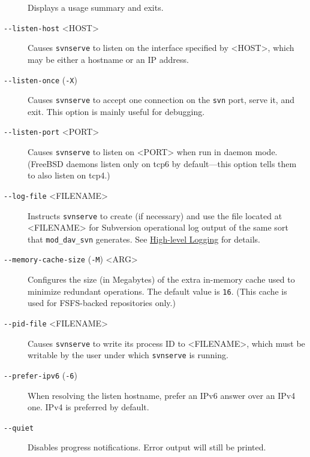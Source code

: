 \begin{description}
Displays a usage summary and exits.
\item[\protect\phantomsection\label{svn.ref.svnserve.sw.listen_host}{}\texttt{-\/-listen-host}
\textless HOST\textgreater{}]
Causes \texttt{svnserve} to listen on the interface specified by
\textless HOST\textgreater, which may be either a hostname or an IP
address.
\item[\protect\phantomsection\label{svn.ref.svnserve.sw.listen_once}{}\texttt{-\/-listen-once}
(\texttt{-X})]
Causes \texttt{svnserve} to accept one connection on the \texttt{svn}
port, serve it, and exit. This option is mainly useful for debugging.
\item[\protect\phantomsection\label{svn.ref.svnserve.sw.listen_port}{}\texttt{-\/-listen-port}
\textless PORT\textgreater{}]
Causes \texttt{svnserve} to listen on \textless PORT\textgreater{} when
run in daemon mode. (FreeBSD daemons listen only on tcp6 by
default---this option tells them to also listen on tcp4.)
\item[\protect\phantomsection\label{svn.ref.svnserve.sw.log_file}{}\texttt{-\/-log-file}
\textless FILENAME\textgreater{}]
Instructs \texttt{svnserve} to create (if necessary) and use the file
located at \textless FILENAME\textgreater{} for Subversion operational
log output of the same sort that \texttt{mod\_dav\_svn} generates. See
\hyperref[svn.serverconfig.operational-logging]{High-level Logging} for
details.
\item[\protect\phantomsection\label{svn.ref.svnserve.sw.memory_cache_size}{}\texttt{-\/-memory-cache-size}
(\texttt{-M}) \textless ARG\textgreater{}]
Configures the size (in Megabytes) of the extra in-memory cache used to
minimize redundant operations. The default value is \texttt{16}. (This
cache is used for FSFS-backed repositories only.)
\item[\protect\phantomsection\label{svn.ref.svnserve.sw.pid_file}{}\texttt{-\/-pid-file}
\textless FILENAME\textgreater{}]
Causes \texttt{svnserve} to write its process ID to
\textless FILENAME\textgreater, which must be writable by the user under
which \texttt{svnserve} is running.
\item[\protect\phantomsection\label{svn.ref.svnserve.sw.prefer_ipv6}{}\texttt{-\/-prefer-ipv6}
(\texttt{-6})]
When resolving the listen hostname, prefer an IPv6 answer over an IPv4
one. IPv4 is preferred by default.
\item[\protect\phantomsection\label{svn.ref.svnserve.sw.quiet}{}\texttt{-\/-quiet}]
Disables progress notifications. Error output will still be printed.

\end{description}
